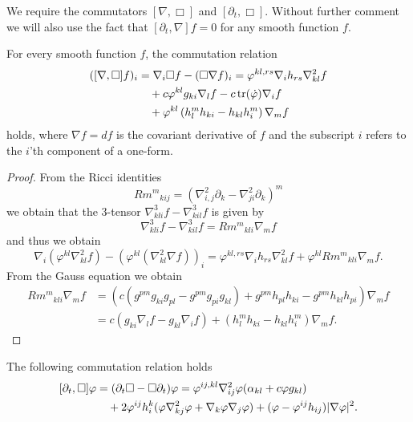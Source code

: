 \documentclass{amsart}
\begin{document}
We require the commutators \([\nabla, \Box]\) and \([\partial_t, \Box]\). Without further comment we will also use the fact that \([\partial_t, \nabla] f = 0\) for any smooth function \(f\).

\begin{lemma}
\label{lem:gradBox}
For every smooth function $f$, the commutation relation
\[
\begin{split}
([\nabla, \Box]f)_i &= \nabla_i \Box f - (\Box \nabla f)_i = \varphi^{kl,rs} \nabla_i h_{rs} \nabla^2_{kl} f \\
&\quad + c \varphi^{kl} g_{ki} \nabla_l f - c \operatorname{tr}(\dot{\varphi}) \nabla_i f \\
&\quad + \varphi^{kl}\left(h^{m}_{l}h_{ki} - h_{kl}h^{m}_{i}\right) \nabla_m f
\end{split}
\]
holds, where \(\nabla f = df\) is the covariant derivative of \(f\) and the subscript \(i\) refers to the \(i\)'th component of a one-form.
\end{lemma}

\begin{proof}
From the Ricci identities
\[
{Rm^m}_{kij}  = \left(\nabla^2_{i, j} \partial_k - \nabla^2_{ji} \partial_k\right)^m
\]
we obtain that the $3$-tensor $\nabla^3_{kli}f-\nabla^3_{kil}f$
is given by
\[
\nabla^3_{kli}f-\nabla^3_{kil}f={Rm^m}_{kli}\nabla_m f
\]
and thus we obtain
\[
\nabla_i (\varphi^{kl} \nabla^2_{kl} f) - (\varphi^{kl}(\nabla^2_{kl} \nabla f))_i = \varphi^{kl,rs} \nabla_i h_{rs} \nabla^2_{kl}f + \varphi^{kl}{Rm^{m}}_{kli} \nabla_m f.
\]
From the Gauss equation we obtain
\[
\begin{split}
{Rm^{m}}_{kli} \nabla_m f &= \left(c\left(g^{pm}g_{ki}g_{pl}  - g^{pm}g_{pi}g_{kl}\right) + g^{pm} h_{pl}h_{ki} - g^{pm}h_{kl}h_{pi}\right) \nabla_m f \\
&= c\left(g_{ki} \nabla_l f - g_{kl} \nabla_i f\right) + \left(h^{m}_{l}h_{ki} - h_{kl}h^{m}_{i}\right) \nabla_m f.
\end{split}
\]
\end{proof}

\begin{lemma}
\label{lem:deltBox}
The following commutation relation holds
\[
\begin{split}
[\partial_t, \Box] \varphi &= (\partial_{t}\Box - \Box\partial_{t}) \varphi = \varphi^{ij,kl} \nabla^2_{ij} \varphi (\alpha_{kl} + c \varphi g_{kl}) \\
&\quad + 2\varphi^{ij}h^{k}_{i} (\varphi \nabla^2_{k
j} \varphi + \nabla_k \varphi \nabla_j \varphi) + (\varphi - \varphi^{ij}h_{ij})| \nabla\varphi|^{2}.
\end{split}
\]
\end{lemma}
\end{document}
